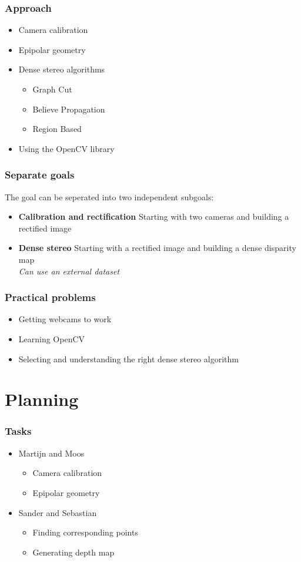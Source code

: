   \frametitle{Approach}
  \begin{itemize}
    \item Camera calibration
    \item Epipolar geometry
     \item Dense stereo algorithms
      \begin{itemize}
       \item Graph Cut
       \item Believe Propagation
       \item Region Based
      \end{itemize}
    \item Using the OpenCV library
  \end{itemize}

  \frametitle{Separate goals}
  The goal can be seperated into two independent subgoals:

  \begin{itemize}
   \item \textbf{Calibration and rectification} Starting with two cameras and building a rectified image
   \item \textbf{Dense stereo} Starting with a rectified image and building a dense disparity map \\ \textit{Can use an external dataset}
  \end{itemize}

  \frametitle{Practical problems}
  \begin{itemize}
   \item Getting webcams to work
   \item Learning OpenCV
   \item Selecting and understanding the right dense stereo algorithm
  \end{itemize}


\section{Planning}


  \frametitle{Tasks}
  \begin{itemize}
    \item Martijn and Moos
    \begin{itemize}
      \item Camera calibration
      \item Epipolar geometry
    \end{itemize}
    \item Sander and Sebastian
    \begin{itemize}
      \item Finding corresponding points
      \item Generating depth map
    \end{itemize}
  \end{itemize}


